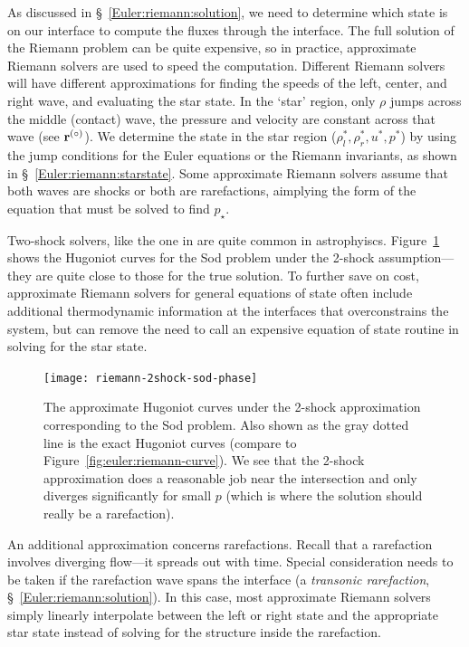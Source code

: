 As discussed in \S~\ref{Euler:riemann:solution}, we need to determine
which state is on our interface to compute the fluxes through the
interface.  The full solution of the Riemann problem can be quite expensive,
so in practice, approximate Riemann solvers are used to speed
the computation.  Different Riemann solvers
will have different approximations for finding the speeds of the left,
center, and right wave, and evaluating the star state.  In the `star'
region, only $\rho$ jumps across the middle (contact) wave, the
pressure and velocity are constant across that wave (see ${\bf r}^{(\circ)}$).
We determine the state in the star region ($\rho_l^*, \rho_r^*, u^*,
p^*$) by using the jump conditions for the Euler equations or the
Riemann invariants, as shown in \S~\ref{Euler:riemann:starstate}.
Some approximate Riemann solvers assume that both waves are shocks or
both are rarefactions, aimplying the form of the equation that
must be solved to find $p_\star$.

Two-shock solvers, like the one in \cite{colellaglaz:1985} are quite
common in astrophyiscs.  Figure~\ref{fig:euler:riemann-2shock-curve}
shows the Hugoniot curves for the Sod problem under the 2-shock
assumption---they are quite close to those for the true solution.  To
further save on cost, approximate Riemann solvers for general
equations of state often include additional thermodynamic information
at the interfaces that overconstrains the system, but can remove the
need to call an expensive equation of state routine in solving for the
star state.


\begin{figure}[t]
\centering
\texttt{[image: riemann-2shock-sod-phase]}
\caption[The approximate (2-shock) Hugoniot curves corresponding to
  the Sod problem]{\label{fig:euler:riemann-2shock-curve} The
  approximate Hugoniot curves under the 2-shock approximation
  corresponding to the Sod problem.  Also shown as the gray dotted
  line is the exact Hugoniot curves (compare to
  Figure~\ref{fig:euler:riemann-curve}).  We see that the 2-shock
  approximation does a reasonable job near the intersection and only
  diverges significantly for small $p$ (which is where the solution
  should really be a
  rarefaction).\\ 
  }
\end{figure}

An additional approximation concerns rarefactions.  Recall that a
rarefaction involves diverging flow---it spreads out with time.
Special consideration needs to be taken if the rarefaction wave spans
the interface (a {\em transonic rarefaction},
\S~\ref{Euler:riemann:solution}).  In this case, most approximate
Riemann solvers simply linearly interpolate between the left or right
state and the appropriate star state instead of solving for the
structure inside the rarefaction.

